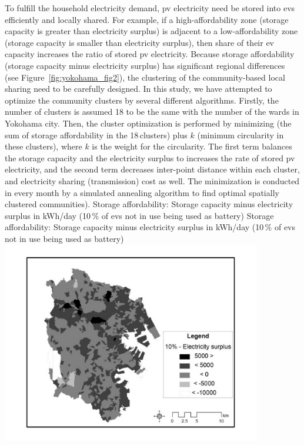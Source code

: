 To fulfill the household electricity demand, \gls{pv} electricity need be stored into \glspl{ev} efficiently and locally shared. For example, if a high-affordability zone (storage capacity is greater than electricity surplus) is adjacent to a low-affordability zone (storage capacity is smaller than electricity surplus), then share of their \gls{ev} capacity increases the ratio of stored \gls{pv} electricity. Because storage affordability (storage capacity minus electricity surplus) has significant regional differences (see Figure~\ref{fig:yokohama_fig2}), the clustering of the community-based local sharing need to be carefully designed. In this study, we have attempted to optimize the community clusters by several different algorithms. Firstly, the number of clusters is assumed 18 to be the same with the number of the wards in Yokohama city. Then, the cluster optimization is performed by minimizing (the sum of storage affordability in the 18\,clusters) plus $k$ (minimum circularity in these clusters), where $k$ is the weight for the circularity. The first term balances the storage capacity and the electricity surplus to increases the rate of stored \gls{pv} electricity, and the second term decreases inter-point distance within each cluster, and electricity sharing (transmission) cost as well. The minimization is conducted in every month by a simulated annealing algorithm to find optimal spatially clustered communities).
%
\createfigure%
{Storage affordability: Storage capacity minus electricity surplus in kWh/day (10\,\% of \glspl{ev} not in use being used as battery)}%
{Storage affordability: Storage capacity minus electricity surplus in kWh/day (10\,\% of \glspl{ev} not in use being used as battery)}%
{\label{fig:yokohama_fig2}}%
{\includegraphics[width=0.85\textwidth, angle=0]{./scenarios/figures/yokohama_fig2.png}}%
